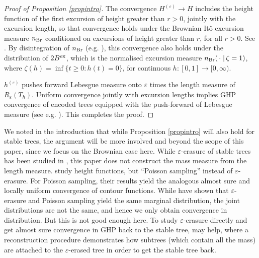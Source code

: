 \documentclass[11pt,a4paper]{article}
\begin{document}
\begin{proof}[Proof of Proposition \ref{propintro}]
  The convergence $H^{(\varepsilon)}\rightarrow H$ includes the height function of the first excursion of height greater than $r>0$, jointly with the excursion length,
  so that convergence holds under the Brownian It\^o excursion measure $n_{\rm Br}$ conditioned on excursions of height greater than $r$, for all $r>0$. See
  \cite[Chapter XII]{RY}. 
  By disintegration of $n_{\rm Br}$ (e.g. \cite[Theorem 22.15]{kal}), this convergence also holds under the distribution of $2B^{\rm ex}$, which is
  the normalised excursion measure $n_{\rm Br}(\,\cdot\;|\,\zeta=1)$, where $\zeta(h)=\inf\{t\ge 0\colon h(t)=0\}$, for continuous $h\colon[0,1]\rightarrow[0,\infty)$.
  
  $h^{(\varepsilon)}$ pushes forward Lebesgue measure onto $\varepsilon$ times the length measure of $R_\varepsilon(T_h)$.
  Uniform convergence jointly with excursion lengths implies GHP convergence of encoded trees equipped with the push-forward of Lebesgue measure (see e.g. \cite{ADHo}). 
  This completes the proof.
\end{proof}

We noted in the introduction that while Proposition \ref{propintro} will also hold for stable trees, the argument will be more involved and beyond the scope of this
paper, since we focus on the Brownian case here. While $\varepsilon$-erasure of stable trees has been studied in \cite{DuWi12}, this paper does not construct the
mass measure from the length measure. \cite{DuLG} study height functions, but ``Poisson sampling'' instead of $\varepsilon$-erasure. For Poisson sampling, their results yield the
analogous almost sure and locally uniform convergence of contour functions. While \cite{DuWi12} have shown that $\varepsilon$-erasure and Poisson sampling yield the same marginal
distribution, the joint distributions are not the same, and hence we only obtain convergence in distribution. But this is not good enough here. To study $\varepsilon$-erasure
directly and get almost sure convergence in GHP back to the stable tree, \cite{DuWi13} may help, where a reconstruction procedure demonstrates how subtrees (which contain
all the mass) are attached to the $\varepsilon$-erased tree in order to get the stable tree back.
\end{document}
